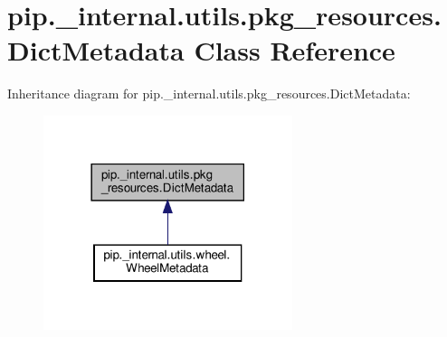 \hypertarget{classpip_1_1__internal_1_1utils_1_1pkg__resources_1_1DictMetadata}{}\section{pip.\+\_\+internal.\+utils.\+pkg\+\_\+resources.\+Dict\+Metadata Class Reference}
\label{classpip_1_1__internal_1_1utils_1_1pkg__resources_1_1DictMetadata}


Inheritance diagram for pip.\+\_\+internal.\+utils.\+pkg\+\_\+resources.\+Dict\+Metadata\+:
\nopagebreak
\begin{figure}[H]
\begin{center}
\leavevmode
\includegraphics[width=206pt]{classpip_1_1__internal_1_1utils_1_1pkg__resources_1_1DictMetadata__inherit__graph}
\end{center}
\end{figure}
